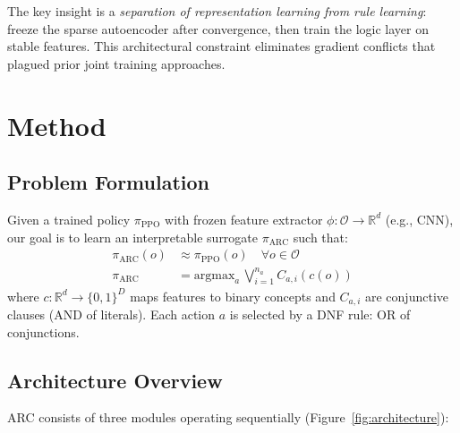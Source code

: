 \documentclass[11pt,twocolumn]{article}
\begin{document}
The key insight is a \emph{separation of representation learning from rule learning}: freeze the sparse autoencoder after convergence, then train the logic layer on stable features. This architectural constraint eliminates gradient conflicts that plagued prior joint training approaches.

\section{Method}

\subsection{Problem Formulation}

Given a trained policy $\pi_\text{PPO}$ with frozen feature extractor $\phi: \mathcal{O} \to \mathbb{R}^d$ (e.g., CNN), our goal is to learn an interpretable surrogate $\pi_\text{ARC}$ such that:
\begin{align}
\pi_\text{ARC}(o) &\approx \pi_\text{PPO}(o) \quad \forall o \in \mathcal{O} \\
\pi_\text{ARC} &= \text{argmax}_a \, \bigvee_{i=1}^{n_a} C_{a,i}(c(o))
\end{align}
where $c: \mathbb{R}^d \to \{0,1\}^D$ maps features to binary concepts and $C_{a,i}$ are conjunctive clauses (AND of literals). Each action $a$ is selected by a DNF rule: OR of conjunctions.

\subsection{Architecture Overview}

ARC consists of three modules operating sequentially (Figure~\ref{fig:architecture}):
\end{document}
